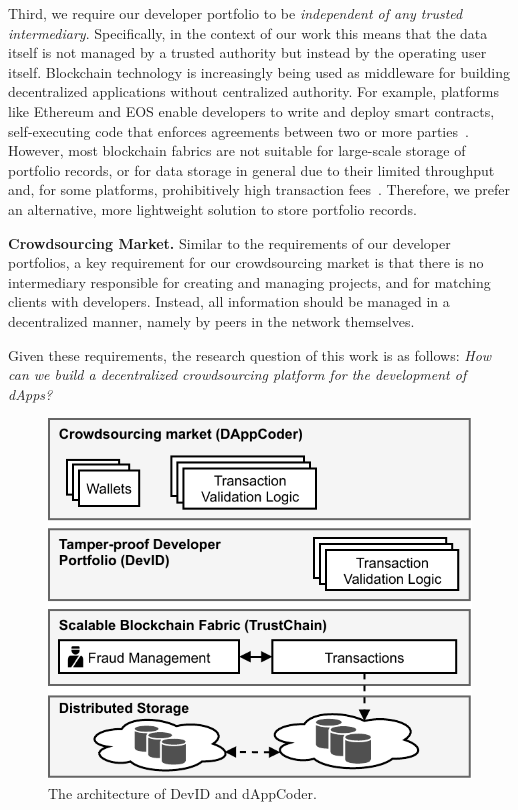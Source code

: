 Third, we require our developer portfolio to be \emph{independent of any trusted intermediary}.
Specifically, in the context of our work this means that the data itself is not managed by a trusted authority but instead by the operating user itself.
Blockchain technology is increasingly being used as middleware for building decentralized applications without centralized authority.
For example, platforms like Ethereum and EOS enable developers to write and deploy smart contracts, self-executing code that enforces agreements between two or more parties~\cite{szabo1997formalizing}.
However, most blockchain fabrics are not suitable for large-scale storage of portfolio records, or for data storage in general due to their limited throughput and, for some platforms, prohibitively high transaction fees~\cite{eberhardt2017or}.
Therefore, we prefer an alternative, more lightweight solution to store portfolio records.

\textbf{Crowdsourcing Market.}
Similar to the requirements of our developer portfolios, a key requirement for our crowdsourcing market is that there is no intermediary responsible for creating and managing projects, and for matching clients with developers.
Instead, all information should be managed in a decentralized manner, namely by peers in the network themselves.

Given these requirements, the research question of this work is as follows:
\textit{How can we build a decentralized crowdsourcing platform for the development of dApps?}
\begin{figure}[t!]
	\centering
	\includegraphics[width=.7\linewidth]{devid/resources/architecture.pdf}
	\caption{The architecture of DevID and dAppCoder.}
	\label{fig:dappcoder_system_architecture}
\end{figure}

